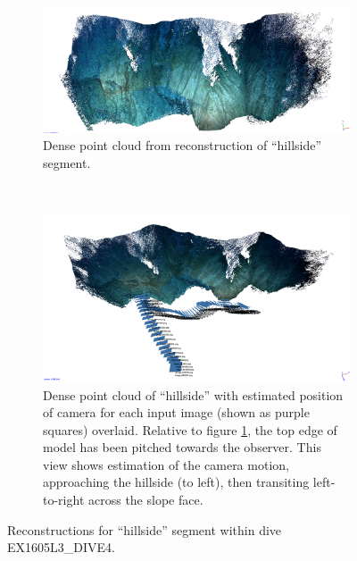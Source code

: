 \documentclass[letterpaper,12pt]{article}
\begin{document}
\begin{figure}
    \centering
    \begin{subfigure}[b]{0.95\textwidth}
        \includegraphics[width=\textwidth]{images/hillside_reconstruction.png}
        \caption{Dense point cloud from reconstruction of ``hillside'' segment.}
        \label{fig:hillside_photoscan}
    \end{subfigure}
    \\[24pt]
    \begin{subfigure}[b]{0.95\textwidth}
        \includegraphics[width=\textwidth]{images/hillside_reconstruction_trajectory.png}
        \caption{Dense point cloud of ``hillside'' with estimated position of camera for each input image (shown as purple squares) overlaid.  Relative to figure \ref{fig:hillside_photoscan}, the top edge of model has been pitched towards the observer.  This view shows estimation of the camera motion, approaching the hillside (to left), then transiting left-to-right across the slope face.}
        \label{fig:hillside_photoscan_trajectory}
    \end{subfigure}
    \caption{Reconstructions for ``hillside'' segment within dive EX1605L3\_DIVE4.}
\end{figure}
\end{document}
